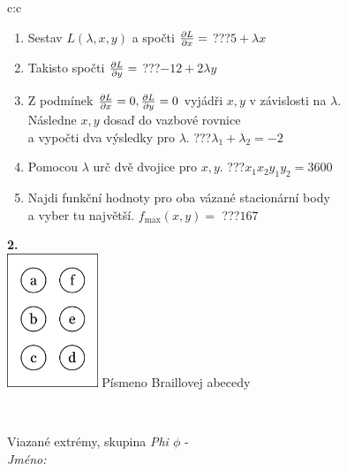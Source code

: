 \documentclass[10pt]{report}
\begin{document}
\begin{tabular}{c:c}
\begin{minipage}[c][104.5mm][t]{0.5\linewidth}
\begin{center}
\begin{minipage}{0.79\linewidth}
\begin{center}
\begin{varwidth}{\linewidth}
\begin{enumerate}
\item Sestav $L(\lambda,x,y)$ a spočti $\pdv{L}{x}=$\quad \dotfill\; ???\;\dotfill \quad $5+\lambda x$
\item Takisto spočti $\pdv{L}{y}=$\quad \dotfill\; ???\;\dotfill \quad $-12+2\lambda y$
\item Z podmínek $\pdv{L}{x}=0 , \pdv{L}{y}=0$ vyjádři $x,y$ v závislosti na $\lambda$.\\ \phantom{xxxxxx}Následne $x,y$ dosaď do vazbové rovnice\\ \phantom{xxxxxx}a vypočti dva výsledky pro $\lambda$.\quad \dotfill\; ???\;\dotfill \quad $\lambda_1+\lambda_2=-2$
\item Pomocou $\lambda$ urč dvě dvojice pro $x,y$.\quad \dotfill\; ???\;\dotfill \quad $x_1 x_2 y_1 y_2=3600$
\item Najdi funkční hodnoty pro oba vázané stacionární body\\ \phantom{xxxxxx}a vyber tu najvětší. $f_{\text{max}}(x,y)=$\quad \dotfill\; ???\;\dotfill \quad $167$
\end{enumerate}
\end{varwidth}
\end{center}
\end{minipage}
\begin{minipage}{0.20\linewidth}
\begin{center}
{\Huge\bfseries 2.} \\[2mm]
\includegraphics[height=40mm]{../images/braille.png}
{\small Písmeno Braillovej abecedy}
\end{center}
\end{minipage}
\end{center}
\end{minipage}
\\ \hdashline
\begin{minipage}[c][104.5mm][t]{0.5\linewidth}
\begin{center}
\vspace{7mm}
{\huge Viazané extrémy, skupina \textit{Phi $\phi$} -}\\[5mm]
\textit{Jméno:}\phantom{xxxxxxxxxxxxxxxxxxxxxxxxxxxxxxxxxxxxxxxxxxxxxxxxxxxxxxxxxxxxxxxxx}\\[5mm]

\end{center}
\end{minipage}
\end{tabular}
\end{document}
